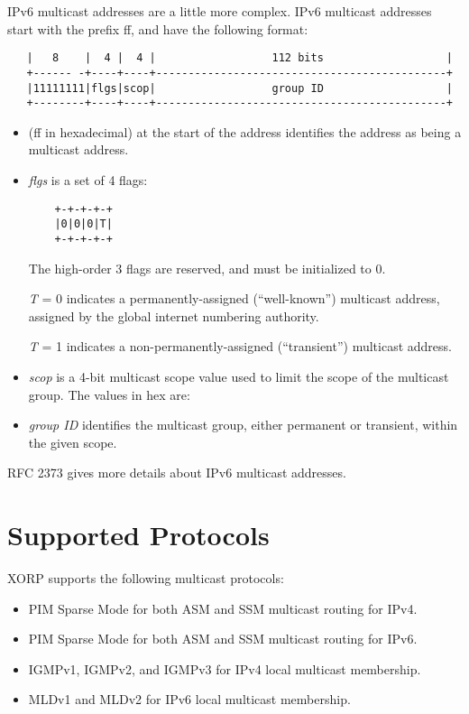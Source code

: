 IPv6 multicast addresses are a little more complex.  IPv6 multicast
addresses start with the prefix {\stt ff}, and have the following
format:
\begin{verbatim}
   |   8    |  4 |  4 |                  112 bits                   |
   +------ -+----+----+---------------------------------------------+
   |11111111|flgs|scop|                  group ID                   |
   +--------+----+----+---------------------------------------------+
\end{verbatim}
\begin{itemize}
\item {} ({\stt ff} in hexadecimal) at the start of the address
identifies the address as being a multicast address.

\item {\it flgs} is a set of 4 flags: 
\begin{verbatim}
    +-+-+-+-+
    |0|0|0|T|
    +-+-+-+-+
\end{verbatim}

The high-order 3 flags are reserved, and must be initialized to 0.

{\it T} = 0 indicates a permanently-assigned (``well-known'') multicast
address, assigned by the global internet numbering authority.

{\it T} = 1 indicates a non-permanently-assigned (``transient'')
multicast address.

\item {\it scop} is a 4-bit multicast scope value used to limit the scope of
the multicast group.  The values in hex are:

\item {\it group ID} identifies the multicast group, either permanent or
transient, within the given scope.  
\end{itemize}

RFC 2373 gives more details about IPv6 multicast addresses.

\section{Supported Protocols}

XORP supports the following multicast protocols:
\begin{itemize}
\item PIM Sparse Mode for both ASM and SSM multicast routing for IPv4.
\item PIM Sparse Mode for both ASM and SSM multicast routing for IPv6.
\item IGMPv1, IGMPv2, and IGMPv3 for IPv4 local multicast membership. 
\item MLDv1 and MLDv2 for IPv6 local multicast membership. 
\end{itemize}
